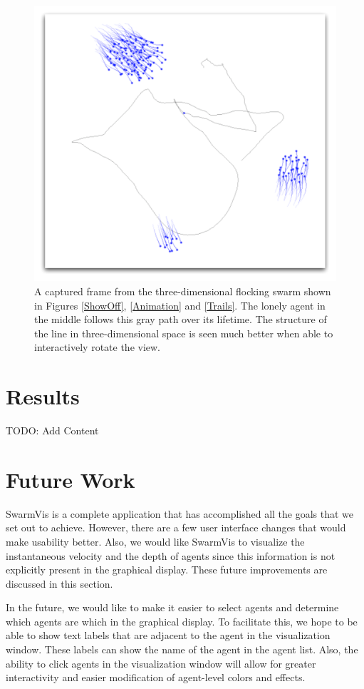 \documentclass[conference]{IEEEtran}
\begin{document}
\begin{figure}
\centering
\includegraphics[scale=.4]{images/track.pdf}
\caption{
A captured frame from the three-dimensional flocking swarm shown in Figures \ref{ShowOff}, \ref{Animation} and \ref{Trails}.
The lonely agent in the middle follows this gray path over its lifetime. The structure of the line in three-dimensional space
is seen much better when able to interactively rotate the view.}
\label{Track}
\end{figure}

\section{Results}

TODO: Add Content


\section{Future Work}
SwarmVis is a complete application that has accomplished all the goals that we set out to achieve. 
However, there are a few user interface changes that would make usability better.
Also, we would like SwarmVis to visualize the instantaneous velocity and the depth of
agents since this information is not explicitly present in the
graphical display. These future improvements are discussed in this section.

In the future, we would like to make it easier to select agents and determine which agents are which in the graphical display.
To facilitate this, we hope to be able to show text labels that are adjacent to the agent in the visualization window.
These labels can show the name of the agent in the agent list.
Also, the ability to click agents in the visualization window will allow for greater interactivity and easier modification of agent-level colors and effects.
\end{document}
